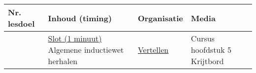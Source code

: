 \begin{landscape}
\begin{tabularx}{1.56\textwidth}{|p{1.5cm}|p{6.5cm}|X|p{4cm}|}
	\hline
	\textbf{Nr. lesdoel } & \textbf{Inhoud (timing)}  & \textbf{Organisatie } & \textbf{Media } \\ \hline
	& \underline{Slot (1 minuut)}\newline
	Algemene inductiewet herhalen	
	&  \underline{Vertellen}\newline 
	&  Cursus hoofdstuk 5 \newline\newline Krijtbord
	\\ \hline
\end{tabularx}

	
\end{landscape}





%
%
%
%
%
%
%
%
%
%